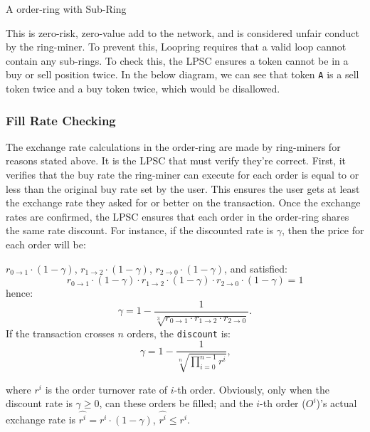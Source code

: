 \documentclass[UTF8,nofonts]{article}
\makeatletter
\newenvironment{figurehere}
 {\def\@captype{figure}}
 {}
\makeatother
\begin{document}
\begin{multicols}{2}
\begin{center}
\begin{figurehere}
\begin{tikzpicture}
\end{tikzpicture}

\caption{A order-ring with Sub-Ring}
\label{fig:subring}
\end{figurehere}
\end{center}

This is zero-risk, zero-value add to the network, and is considered unfair conduct by the ring-miner. To prevent this, Loopring requires that a valid loop cannot contain any sub-rings. To check this, the LPSC ensures a token cannot be in a buy or sell position twice. In the below diagram, we can see that token \verb|A| is a sell token twice and a buy token twice, which would be disallowed. 


\subsubsection{Fill Rate Checking\label{sec:fill_rate_check}}


The exchange rate calculations in the order-ring are made by ring-miners for reasons stated above. It is the LPSC that must verify they're correct. First, it verifies that the buy rate the ring-miner can execute for each order is equal to or less than the original buy rate set by the user. This ensures the user gets at least the exchange rate they asked for or better on the transaction. Once the exchange rates are confirmed, the LPSC ensures that each order in the order-ring shares the same rate discount. For instance, if the discounted rate is $\gamma$, then the price for each order will be:

$r_{0\rightarrow 1} \cdot (1-\gamma)$, $r_{1\rightarrow 2} \cdot (1-\gamma)$, $r_{2 \rightarrow 0} \cdot (1-\gamma)$, and satisfied: 
\begin{equation}
r_{0\rightarrow 1} \cdot (1-\gamma)\cdot r_{1\rightarrow 2} \cdot (1-\gamma) \cdot r_{2 \rightarrow 0} \cdot (1-\gamma) = 1
\end{equation}
hence: 
\begin{equation}
\gamma = 1- \frac{1}{\sqrt[3]{r_{0\rightarrow 1} \cdot r_{1\rightarrow 2} \cdot r_{2\rightarrow 0}}}\text{.}
\end{equation}
If the transaction crosses $n$ orders, the \texttt{discount} is: 
\begin{equation}
\gamma = 1- \frac{1}{\sqrt[n]{\prod_{i=0}^{n-1} r^i}} \text{,}
\end{equation}

where $r^i$ is the order turnover rate of $i$-th order. Obviously, only when the discount rate is $\gamma \ge 0$, can these orders be filled; and the $i$-th order ($O^i$)'s actual exchange rate is $\hat{r^i} = r^i \cdot (1-\gamma)$, $\hat{r^i}\le r^i$.



\end{multicols}
\end{document}
